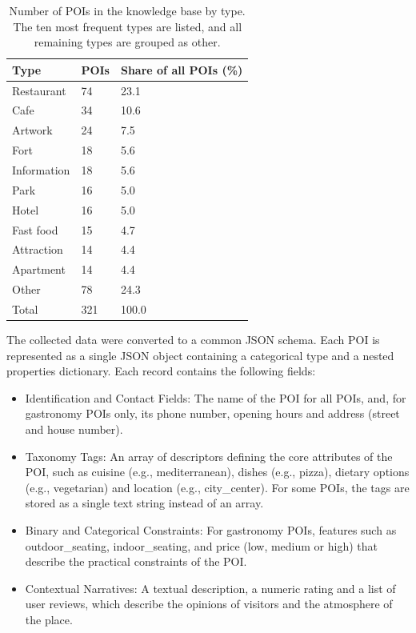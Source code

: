 \documentclass[journal,article,submit,pdftex,moreauthors]{Definitions/mdpi}
\begin{document}
\begin{table}[H]
\caption{Number of POIs in the knowledge base by type. The ten most frequent types are listed, and all remaining types are grouped as other.}\label{tab:poi}
\begin{tabularx}{\textwidth}{lCC}
\toprule
Type & POIs & Share of all POIs (\%)\\
\midrule
Restaurant & 74 & 23.1\\
Cafe & 34 & 10.6\\
Artwork & 24 & 7.5\\
Fort & 18 & 5.6\\
Information & 18 & 5.6\\
Park & 16 & 5.0\\
Hotel & 16 & 5.0\\
Fast food & 15 & 4.7\\
Attraction & 14 & 4.4\\
Apartment & 14 & 4.4\\
Other & 78 & 24.3\\
\midrule
Total & 321 & 100.0\\
\bottomrule
\end{tabularx}
\end{table}

The collected data were converted to a common JSON schema. Each POI is represented as a single JSON object containing a categorical type and a nested properties dictionary. Each record contains the following fields:

\begin{itemize}[labelsep=2.5mm,topsep=-3pt]
\item Identification and Contact Fields: The name of the POI for all POIs, and, for gastronomy POIs only, its phone number, opening hours and address (street and house number).
\item Taxonomy Tags: An array of descriptors defining the core attributes of the POI, such as cuisine (e.g., mediterranean), dishes (e.g., pizza), dietary options (e.g., vegetarian) and location (e.g., city\_center). For some POIs, the tags are stored as a single text string instead of an array.
\item Binary and Categorical Constraints: For gastronomy POIs, features such as outdoor\_seating, indoor\_seating, and price (low, medium or high) that describe the practical constraints of the POI.
\item Contextual Narratives: A textual description, a numeric rating and a list of user reviews, which describe the opinions of visitors and the atmosphere of the place.
\end{itemize}\vspace{3pt}
\end{document}
